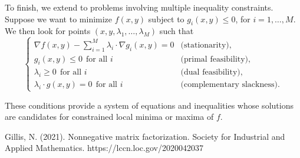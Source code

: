\documentclass{amsart}
\begin{document}
To finish, we extend to problems involving multiple inequality constraints. Suppose we want to minimize $f(x,y)$ subject to $g_i(x,y)\leq 0$, for $i=1,\ldots, M$. We then look for points $(x,y,\lambda_1,\ldots,\lambda_M)$ such that
\begin{equation}
    \label{KKT_conditions}
    \begin{cases}
    \nabla f(x,y) -\sum_{i=1}^M \lambda_i\cdot \nabla g_i(x,y)= 0& \text{(stationarity),}\\
    g_i(x,y)\leq 0\ \ \text{for all $i$} & \text{(primal feasibility),}\\
    \lambda_i\geq 0\ \ \text{for all $i$} & \text{(dual feasibility),}\\
    \lambda_i\cdot g(x,y)= 0\ \ \text{for all $i$} & \text{(complementary slackness).}
    \end{cases}
\end{equation}

These conditions provide a system of equations and inequalities whose solutions are candidates for constrained local minima or maxima of $f$.


\begin{thebibliography}{9}
    Gillis, N. (2021). Nonnegative matrix factorization. Society for Industrial and Applied Mathematics. https://lccn.loc.gov/2020042037
\end{thebibliography}
\end{document}
